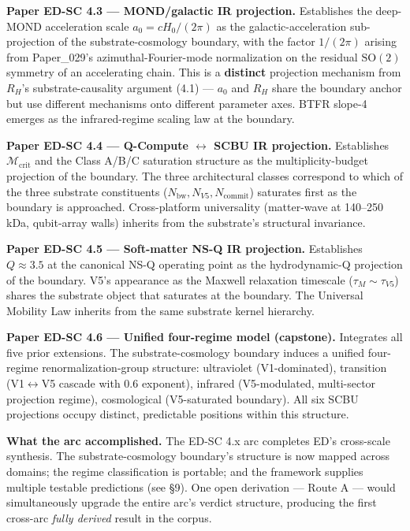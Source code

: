 \documentclass[11pt,a4paper]{article}
\begin{document}
\textbf{Paper ED-SC 4.3 --- MOND/galactic IR projection.} Establishes the deep-MOND acceleration scale $a_0 = c H_0/(2\pi)$ as the galactic-acceleration sub-projection of the substrate-cosmology boundary, with the factor $1/(2\pi)$ arising from Paper\_029's azimuthal-Fourier-mode normalization on the residual $\mathrm{SO}(2)$ symmetry of an accelerating chain. This is a \textbf{distinct} projection mechanism from $R_H$'s substrate-causality argument (4.1) --- $a_0$ and $R_H$ share the boundary anchor but use different mechanisms onto different parameter axes. BTFR slope-4 emerges as the infrared-regime scaling law at the boundary.

\textbf{Paper ED-SC 4.4 --- Q-Compute $\leftrightarrow$ SCBU IR projection.} Establishes $\mathcal{M}_\mathrm{crit}$ and the Class A/B/C saturation structure as the multiplicity-budget projection of the boundary. The three architectural classes correspond to which of the three substrate constituents ($N_\mathrm{bw}, N_{V5}, N_\mathrm{commit}$) saturates first as the boundary is approached. Cross-platform universality (matter-wave at 140--250 kDa, qubit-array walls) inherits from the substrate's structural invariance.

\textbf{Paper ED-SC 4.5 --- Soft-matter NS-Q IR projection.} Establishes $Q \approx 3.5$ at the canonical NS-Q operating point as the hydrodynamic-Q projection of the boundary. V5's appearance as the Maxwell relaxation timescale ($\tau_M \sim \tau_{V5}$) shares the substrate object that saturates at the boundary. The Universal Mobility Law inherits from the same substrate kernel hierarchy.

\textbf{Paper ED-SC 4.6 --- Unified four-regime model (capstone).} Integrates all five prior extensions. The substrate-cosmology boundary induces a unified four-regime renormalization-group structure: ultraviolet (V1-dominated), transition (V1$\leftrightarrow$V5 cascade with 0.6 exponent), infrared (V5-modulated, multi-sector projection regime), cosmological (V5-saturated boundary). All six SCBU projections occupy distinct, predictable positions within this structure.

\textbf{What the arc accomplished.} The ED-SC 4.x arc completes ED's cross-scale synthesis. The substrate-cosmology boundary's structure is now mapped across domains; the regime classification is portable; and the framework supplies multiple testable predictions (see \S9). One open derivation --- Route A --- would simultaneously upgrade the entire arc's verdict structure, producing the first cross-arc \emph{fully derived} result in the corpus.
\end{document}
